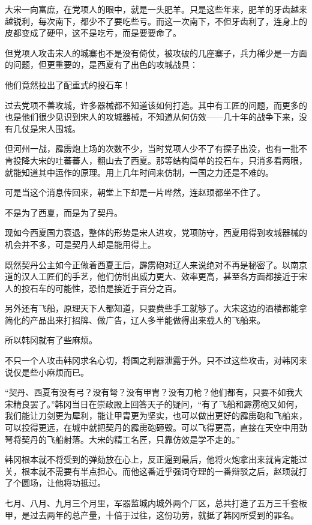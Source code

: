 大宋一向富庶，在党项人的眼中，就是一头肥羊。只是这些年来，肥羊的牙齿越来越锐利，每次南下，都少不了要吃些亏。而这一次南下，不但牙齿利了，连身上的皮都变成了硬甲，这不是吃亏，而是要要命了。

但党项人攻击宋人的城寨也不是没有倚仗，被攻破的几座寨子，兵力稀少是一方面的问题，但更重要的，是西夏有了出色的攻城战具：

他们竟然拉出了配重式的投石车！

过去党项不善攻城，许多器械都不知道该如何打造。其中有工匠的问题，而更多的也是他们很少见识到宋人的攻城器械，不知道从何仿效——几十年的战争下来，没有几仗是宋人围城。

但河州一战，霹雳炮上场的次数不少，当时党项人少不了有探子出没，也有一批不肯投降大宋的吐蕃蕃人，翻山去了西夏。那等结构简单的投石车，只消多看两眼，就能知道其中运作的原理。用上几年时间来仿制，一国之力还是不难的。

可是当这个消息传回来，朝堂上下却是一片哗然，连赵顼都坐不住了。

不是为了西夏，而是为了契丹。

现如今西夏国力衰退，整体的形势是宋人进攻，党项防守，西夏用得到攻城器械的机会并不多，可是契丹人却是能用得上。

既然契丹公主如今正做着西夏王后，霹雳砲对辽人来说绝对不再是秘密了。以南京道的汉人工匠们的手艺，他们仿制出威力更大、效率更高，甚至各方面都接近于宋人的投石车的可能性，恐怕是接近于百分之百。

另外还有飞船，原理天下人都知道，只要费些手工就够了。大宋这边的酒楼都能拿简化的产品出来打招牌、做广告，辽人多半能做得出来载人的飞船来。

所以韩冈就有了些麻烦。

不只一个人攻击韩冈求名心切，将国之利器泄露于外。只不过这些攻击，对韩冈来说仅是些小麻烦而已。

“契丹、西夏有没有弓？没有弩？没有甲胄？没有刀枪？他们都有，只要不如我大宋精良罢了。”韩冈当日在崇政殿上回答天子的疑问，“有了飞船和霹雳砲又如何，我们能让刀剑更为犀利，能让甲胄更为坚实，也可以做出更好的霹雳砲和飞船来，可以投得更远，在城中就把契丹的霹雳砲砸毁。可以飞得更高，直接在天空中用劲弩将契丹的飞船射落。大宋的精工名匠，只靠仿效是学不走的。”

韩冈根本就不将受到的弹劾放在心上，反正逼到最后，他将火炮拿出来就肯定能过关，根本就不需要有半点担心。而他这番近乎强词夺理的一番辩驳之后，赵顼就打了个圆场，让他将功抵过。

七月、八月、九月三个月里，军器监城内城外两个厂区，总共打造了五万三千套板甲，是过去两年的总产量，十倍于过往，这份功劳，就抵了韩冈所受到的罪名。

